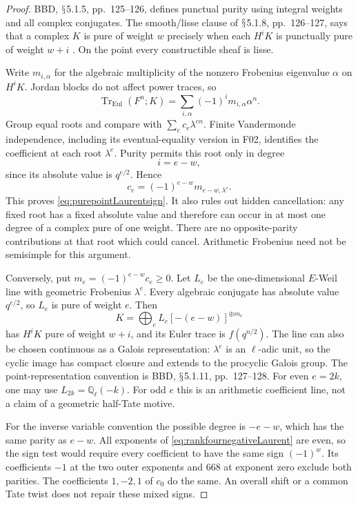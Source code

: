 \documentclass[11pt,a4paper]{article}
\renewcommand{\S}{\ensuremath{\mathsection}}
\newcommand{\fid}[1]{\textsf{#1}}\newcommand{\gate}[1]{\textsf{#1}}
\theoremstyle{named}\newtheorem{finding}{Finding}[section]
\theoremstyle{definition}\newtheorem{definition}[finding]{Definition}
\theoremstyle{remark}\newtheorem{remark}[finding]{Remark}
\begin{document}
\begin{proof}
BBD, \S5.1.5, pp.~125--126, defines punctual purity using
integral weights and all complex conjugates.
The smooth/lisse clause of \S5.1.8, pp.~126--127, says that
a complex \(K\) is pure of weight \(w\) precisely when
each \(H^iK\) is punctually pure of weight \(w+i\)
\cite{BBD}. On the point every constructible sheaf is lisse.

Write \(m_{i,\alpha}\) for the algebraic multiplicity of
the nonzero Frobenius eigenvalue \(\alpha\) on \(H^iK\).
Jordan blocks do not affect power traces, so
\[
 \operatorname{Tr}_{\mathrm{Eul}}(F^n;K)
      =\sum_{i,\alpha}(-1)^i m_{i,\alpha}\alpha^n.
\]
Group equal roots and compare with
\(\sum_e c_e\lambda^{en}\).
Finite Vandermonde independence, including its
eventual-equality version in \fid{F02}, identifies the
coefficient at each root \(\lambda^e\).
Purity permits this root only in degree
\[
                            i=e-w,
\]
since its absolute value is \(q^{e/2}\). Hence
\[
                    c_e=(-1)^{e-w}m_{e-w,\lambda^e}.
\]
This proves \eqref{eq:purepointLaurentsign}.
It also rules out hidden cancellation: any fixed root
has a fixed absolute value and therefore can occur in at
most one degree of a complex pure of one weight.
There are no opposite-parity contributions at that root
which could cancel. Arithmetic Frobenius need not be
semisimple for this argument.

Conversely, put \(m_e=(-1)^{e-w}c_e\ge0\).
Let \(L_e\) be the one-dimensional \(E\)-Weil line with
geometric Frobenius \(\lambda^e\). Every algebraic conjugate
has absolute value \(q^{e/2}\), so \(L_e\) is pure of
weight \(e\). Then
\begin{equation}\label{eq:purepointLaurentconstruction}
           K=\bigoplus_e L_e[-(e-w)]^{\oplus m_e}
\end{equation}
has \(H^iK\) pure of weight \(w+i\), and its Euler trace
is \(f(q^{n/2})\). The line can also be chosen continuous
as a Galois representation: \(\lambda^e\) is an
\(\ell\)-adic unit, so the cyclic image has compact
closure and extends to the procyclic Galois group.
The point-representation convention is BBD,
\S5.1.11, pp.~127--128.
For even \(e=2k\), one may use
\(L_{2k}=\mathbb Q_\ell(-k)\).
For odd \(e\) this is an arithmetic coefficient line,
not a claim of a geometric half-Tate motive.

For the inverse variable convention the possible degree
is \(-e-w\), which has the same parity as \(e-w\).
All exponents of \eqref{eq:rankfournegativeLaurent}
are even, so the sign test would require every coefficient
to have the same sign \((-1)^w\).
Its coefficients \(-1\) at the two outer exponents and
\(668\) at exponent zero exclude both parities.
The coefficients \(1,-2,1\) of \(c_0\) do the same.
An overall shift or a common Tate twist does not repair
these mixed signs.
\end{proof}
\end{document}
